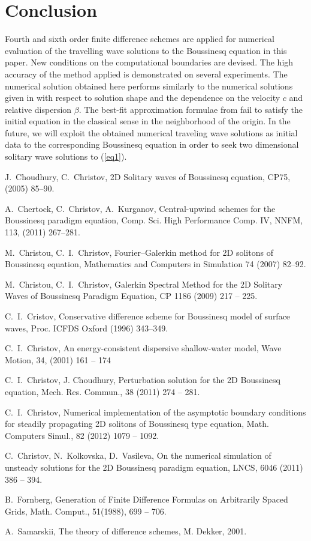 \documentclass[preprint]{elsarticle}
\newcommand{\rf}[1]{(\ref{#1})}
\begin{document}
\section{Conclusion}
Fourth and sixth order finite difference schemes are applied for numerical evaluation of the travelling wave solutions to the Boussinesq equation in this paper. New conditions on the computational boundaries are devised. The high accuracy of the method applied is demonstrated on several experiments. The numerical solution obtained here performs similarly to the numerical solutions given in \cite{Ch2011,Ch2012} with respect to solution shape and the dependence on the velocity $c$ and relative dispersion $\beta$. 
The best-fit approximation formulae from  \cite{Ch2011} fail to satisfy the initial equation in the classical sense in the neighborhood of the origin. 
In the future, we will exploit the obtained numerical traveling wave solutions as initial data to the corresponding Boussinesq equation in order to seek two dimensional solitary wave solutions to \rf{eq1}.

\begin{thebibliography}{30}

J.~Choudhury, C.~Christov, 2D  Solitary waves of  Boussinesq equation, CP75, (2005) 85–90.

A.~Chertock, C.~Christov, A.~Kurganov, Central-upwind schemes for the  Boussinesq paradigm equation, Comp. Sci. High Performance Comp. IV, NNFM, 113, (2011) 267–281.

M.~Christou, C.~I.~Christov, Fourier–Galerkin method for 2D solitons of Boussinesq equation, 
Mathematics and Computers in Simulation 74 (2007) 82–92.
 
M.~Christou, C.~I.~Christov, Galerkin Spectral Method for the 2D Solitary
Waves of Boussinesq Paradigm Equation, CP 1186 (2009) 217 -- 225.

C.~I.~Cristov, Conservative difference scheme for Boussinesq model of
surface waves, Proc. ICFDS Oxford (1996) 343--349.

C.~I.~Christov, An energy-consistent dispersive shallow-water model,
Wave Motion,  34, (2001) 161 -- 174


C.~I.~Christov, J. Choudhury, Perturbation solution  for the 2D Boussinesq equation,       
Mech. Res. Commun., 38 (2011)  274 -- 281.

C.~I.~Christov,  Numerical implementation of the asymptotic boundary conditions
for steadily propagating 2D solitons of   Boussinesq type equation,       
Math. Computers  Simul., 82 (2012)  1079 -- 1092.

C.~Christov, N.~Kolkovska, D.~Vasileva, On the numerical simulation of unsteady solutions for the 2D Boussinesq paradigm equation, LNCS, 6046  (2011) 386 -- 394.

B.~Fornberg, Generation of Finite Difference Formulas on Arbitrarily Spaced Grids, 
Math. Comput., 51(1988),  699 -- 706.

A.~Samarskii, The theory of difference schemes, M. Dekker,  2001.


\end{thebibliography}
\end{document}
